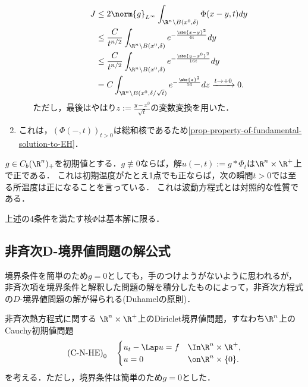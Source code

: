 \documentclass[uplatex,dvipdfmx]{jsreport}
\begin{document}
\begin{Proof}
\begin{enumerate}
\begin{enumerate}[(i)]
\begin{align*}
                J&\le2\norm{g}_{L^\infty}\int_{\R^n\setminus B(x^0,\delta)}\Phi(x-y,t)dy\\
                &\le\frac{C}{t^{n/2}}\int_{\R^n\setminus B(x^0,\delta)}e^{-\frac{\abs{x-y}^2}{4t}}dy\\
                &\le\frac{C}{t^{n/2}}\int_{\R^n\setminus B(x^0,\delta)}e^{-\frac{\abs{y-x^0}^2}{16t}}dy\\
                &=C\int_{\R^n\setminus B(x^0,\delta/\sqrt{t})}e^{-\frac{\abs{z}^2}{16}}dz\xrightarrow{t\to+0}0.
            \end{align*}
            ただし，最後はやはり$z:=\frac{y-x^0}{\sqrt{t}}$の変数変換を用いた．
        \end{enumerate}
        \item これは，$(\Phi(-,t))_{t>0}$は総和核であるため\ref{prop-property-of-fundamental-solution-to-EH}．
    \end{enumerate}
\end{Proof}

\begin{observation}[熱方程式は無限伝播速度を許す]
    $g\in C_b(\R^n)_+$を初期値とする．$g\not\equiv 0$ならば，解$u(-,t):=g*\Phi_t$は$\R^n\times\R^+$上で正である．
    これは初期温度がたとえ1点でも正ならば，次の瞬間$t>0$では至る所温度は正になることを言っている．
    これは波動方程式とは対照的な性質である．
\end{observation}

\begin{theorem}
    上述の4条件を満たす核$\Phi$は基本解に限る．
\end{theorem}

\subsection{非斉次D-境界値問題の解公式}

\begin{tcolorbox}[colframe=ForestGreen, colback=ForestGreen!10!white,breakable,colbacktitle=ForestGreen!40!white,coltitle=black,fonttitle=\bfseries\sffamily,
title=]
    境界条件を簡単のため$g=0$としても，手のつけようがないように思われるが，
    非斉次項を境界条件と解釈した問題の解を積分したものによって，非斉次方程式の$D$-境界値問題の解が得られる(Duhamelの原則)．
\end{tcolorbox}

\begin{problem*}
    非斉次熱方程式に関する
    $\R^n\times\R^+$上のDiriclet境界値問題，すなわち$\R^n$上のCauchy初期値問題
    \[\text{(C-N-HE)}_0\quad\begin{cases}
        u_t-\Lap u=f&\In\R^n\times\R^+,\\
        u=0&\on\R^n\times\{0\}.
    \end{cases}\]
    を考える．ただし，境界条件は簡単のため$g=0$とした．
\end{problem*}
\end{document}
